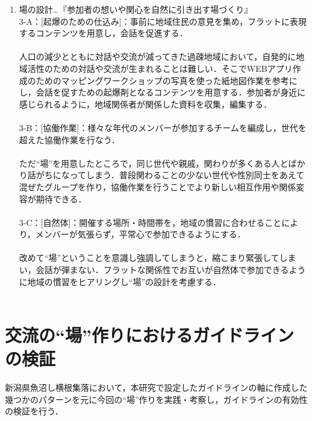 \documentclass[a4paper]{jsarticle}
\begin{document}
\begin{enumerate}
\item 場の設計…『参加者の想いや関心を自然に引き出す場づくり』\\
3-A：[起爆のための仕込み]：事前に地域住民の意見を集め，フラットに表現するコンテンツを用意し，会話を促進する．\\\\

人口の減少とともに対話や交流が減ってきた過疎地域において，自発的に地域活性のための対話や交流が生まれることは難しい．そこでWEBアプリ作成のためのマッピングワークショップの写真を使った紙地図作業を参考にし，会話を促すための起爆剤となるコンテンツを用意する．参加者が身近に感じられるように，地域関係者が関係した資料を収集，編集する．\\\\

3-B：[協働作業]：様々な年代のメンバーが参加するチームを編成し，世代を超えた協働作業を行なう．\\\\
ただ“場”を用意したところで，同じ世代や親戚，関わりが多くある人とばかり話がちになってしまう．普段関わることの少ない世代や性別同士をあえて混ぜたグループを作り，協働作業を行うことでより新しい相互作用や関係変容が期待できる．\\\\
3-C：[自然体]：開催する場所・時間帯を，地域の慣習に合わせることにより，メンバーが気張らず，平常心で参加できるようにする．\\\\
改めて“場”ということを意識し強調してしまうと，縮こまり緊張してしまい，会話が弾まない．フラットな関係性でお互いが自然体で参加できるように地域の慣習をヒアリングし“場”の設計を考慮する．
\\\\
\end{enumerate}

\newpage
\section{交流の“場”作りにおけるガイドラインの検証}
新潟県魚沼し横根集落において，本研究で設定したガイドラインの軸に作成した幾つかのパターンを元に今回の“場”作りを実践・考察し，ガイドラインの有効性の検証を行う．
\end{document}
